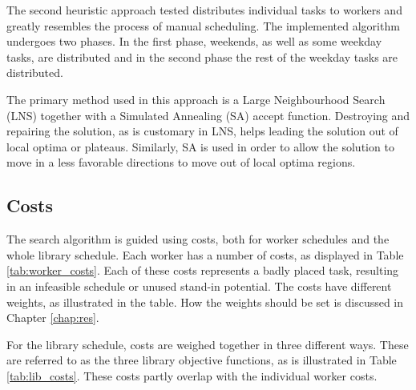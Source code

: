 The second heuristic approach tested distributes individual tasks to workers and greatly resembles the process of manual scheduling. The implemented algorithm undergoes two phases. In the first phase, weekends, as well as some weekday tasks, are distributed and in the second phase the rest of the weekday tasks are distributed. 

The primary method used in this approach is a Large Neighbourhood Search (LNS) together with a Simulated Annealing (SA) accept function. Destroying and repairing the solution, as is customary in LNS, helps leading the solution out of local optima or plateaus. Similarly, SA is used in order to allow the solution to move in a less favorable directions to move out of local optima regions.

\subsection{Costs} \label{subsection:tasks_cost}
The search algorithm is guided using costs, both for worker schedules and the whole library schedule. Each worker has a number of costs, as displayed in Table \ref{tab:worker_costs}. Each of these costs represents a badly placed task, resulting in an infeasible schedule or unused stand-in potential. The costs have different weights, as illustrated in the table. How the weights should be set is discussed in Chapter \ref{chap:res}. 

For the library schedule, costs are weighed together in three different ways. These are referred to as the three library objective functions, as is illustrated in Table \ref{tab:lib_costs}. These costs partly overlap with the individual worker costs.

